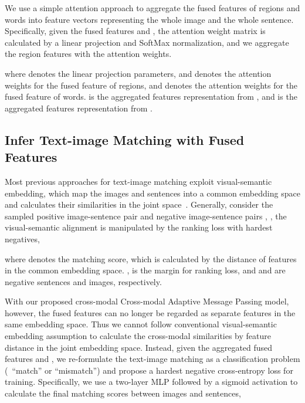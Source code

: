 \documentclass[10pt,twocolumn,letterpaper]{article}
\begin{document}
We use a simple attention approach to aggregate the fused features of  regions and  words into feature vectors representing the whole image and the whole sentence.
Specifically, given the fused features  and , the attention weight matrix is calculated by a linear projection and SoftMax normalization, and we aggregate the region features with the attention weights.

where  denotes the linear projection parameters, and  denotes the attention weights for the fused feature of  regions, and  denotes the attention weights for the fused feature of  words.
 is the aggregated features representation from , and  is the aggregated features representation from .





\subsection{Infer Text-image Matching with Fused Features}
\label{sec:infer}

Most previous approaches for text-image matching exploit visual-semantic embedding, which map the images and sentences into a common embedding space and calculates their similarities in the joint space~\cite{lee2018stacked, faghri2017vse++,gu2018look,zheng2017dual,nam2016dual}. 
Generally, consider the sampled positive image-sentence pair  and negative image-sentence pairs , , the visual-semantic alignment is manipulated by the ranking loss with hardest negatives,

where  denotes the matching score, which is calculated by the distance of features in the common embedding space. 
,  is the margin for ranking loss, and  and  are negative sentences and images, respectively.


With our proposed cross-modal Cross-modal Adaptive Message Passing model, however, the fused features can no longer be regarded as separate features in the same embedding space. 
Thus we cannot follow conventional visual-semantic embedding assumption to calculate the cross-modal similarities by feature distance in the joint embedding space. 
Instead, given the aggregated fused features  and , we re-formulate the text-image matching as a classification problem (\ie~``match'' or ``mismatch'') and propose a hardest negative cross-entropy loss for training.
Specifically, we use a two-layer MLP followed by a sigmoid activation to calculate the final matching scores between images and sentences,
\end{document}

